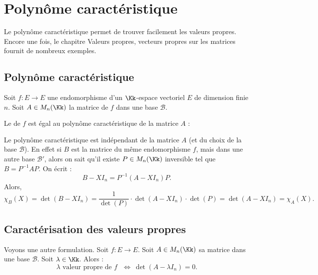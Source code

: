 \documentclass[12pt, class=report,crop=false]{standalone}
\begin{document}
\section{Polynôme caractéristique}

Le polynôme caractéristique permet de trouver facilement les valeurs propres.
Encore une fois, le chapitre \og{}Valeurs propres, vecteurs propres\fg{}
sur les matrices fournit de nombreux exemples.




\subsection{Polynôme caractéristique}


\begin{definition}
Soit $f : E \to E$ une endomorphisme d'un $\Kk$-espace vectoriel $E$ de dimension finie $n$.
Soit $A\in M_n(\Kk)$ la matrice de $f$ dans une base $\mathcal{B}$.

Le  de $f$ est égal au polynôme caractéristique de la matrice $A$ :
\end{definition}

Le polynôme caractéristique est indépendant de la matrice $A$ (et du choix de la base $\mathcal{B}$).
En effet si $B$ est la matrice du même endomorphisme $f$, mais dans une autre base $\mathcal{B}'$, alors on sait qu'il existe $P \in M_n(\Kk)$ inversible tel que $B = P^{-1}AP$.
On écrit :
$$B-XI_n = P^{-1}(A-XI_n)P.$$
Alors, 
$$\chi_B(X) 
= \det(B-XI_n)
= \frac{1}{\det(P)} \cdot \det(A-XI_n) \cdot \det(P)
= \det(A-XI_n) 
= \chi_A(X).$$



\subsection{Caractérisation des valeurs propres}

\begin{proposition}
\sauteligne
\label{prop:diagonvpcarac}
\end{proposition}

Voyons une autre formulation.
Soit $f : E \to E$. Soit $A \in M_n(\Kk)$ sa matrice dans une base $\mathcal{B}$.
Soit $\lambda \in \Kk$. Alors :
\[\lambda \text{ valeur propre de $f$ } \iff \ \det (A-\lambda I_n) = 0 .\]
\end{document}
